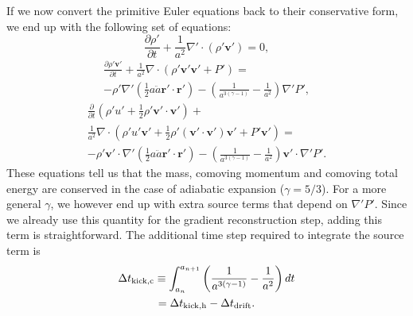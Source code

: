 If we now convert the primitive Euler equations back to their conservative form,
we end up with the following set of equations:
\begin{equation}
\frac{\partial{} \rho{}'}{\partial{} t} + \frac{1}{a^2} \nabla{}' \cdot \left(
\rho{}' \mathbf{v}' \right) = 0,
\end{equation}
\begin{multline}
\frac{\partial{} \rho{}' \mathbf{v}'}{\partial{} t} + \frac{1}{a^2}
\nabla{} \cdot \left( \rho{}' \mathbf{v}'\mathbf{v}' + P' \right) = \\
- \rho{}' \nabla{}' \left( \frac{1}{2} a \ddot{a} \mathbf{r}'\cdot\mathbf{r}'
\right) - \left(\frac{1}{a^{3(\gamma{} - 1)}} - \frac{1}{a^2} \right)
\nabla{}'P',
\end{multline}
\begin{multline}
\frac{\partial{}}{\partial{} t} \left( \rho{}' u' + \frac{1}{2} \rho{}'
\mathbf{v}'\cdot\mathbf{v}' \right) +\\
\frac{1}{a^2}\nabla{} \cdot \left( \rho{}' u' \mathbf{v}' +
\frac{1}{2} \rho{}' \left(\mathbf{v}'\cdot \mathbf{v}'\right)
\mathbf{v}' + P' \mathbf{v}' \right) =\\
- \rho{}' \mathbf{v}'\cdot\nabla{}' \left( \frac{1}{2} a \ddot{a} \mathbf{r}'\cdot
\mathbf{r}' \right) -
\left(\frac{1}{a^{3(\gamma{} - 1)}} - \frac{1}{a^2} \right)
\mathbf{v}'\cdot\nabla{}'P'.
\end{multline}
These equations tell us that the mass, comoving momentum and comoving total
energy are conserved in the case of adiabatic expansion ($\gamma{} = 5/3$).
For a more general $\gamma{}$, we however end up with extra source terms that
depend on $\nabla{}'P'$. Since we already use this quantity for the gradient
reconstruction step, adding this term is straightforward. The additional time
step required to integrate the source term is
\begin{multline}
\Delta{} t_{\rm{} kick,c} \equiv \int_{a_n}^{a_{n+1}}
\left(\frac{1}{a^{3(\gamma{} - 1)}} - \frac{1}{a^2} \right) dt \\ =
\Delta{} t_{\rm{} kick,h} - \Delta{} t_{\rm{} drift}.
\end{multline}

